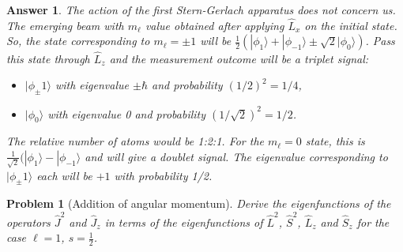 \documentclass[a4paper]{article}
\newtheorem{ans}{Answer}[section]
\theoremstyle{new}
\newtheorem{qns}{Problem}[section]
\begin{document}
\begin{ans}
The action of the first Stern-Gerlach apparatus does not concern us. The emerging beam with $m_\ell$ value obtained after applying $\hat{L}_x$ on the initial state. So, the state corresponding to $m_\ell=\pm1$ will be $\frac{1}{2}(|\phi_1\rangle+|\phi_{-1}\rangle\pm\sqrt{2}|\phi_0\rangle)$. Pass this state through $\hat{L}_z$ and the measurement outcome will be a triplet signal:
\begin{itemize}
    \item $|\phi_\pm1\rangle$ with eigenvalue $\pm\hbar$ and probability $(1/2)^2=1/4$,
    \item $|\phi_0\rangle$ with eigenvalue 0 and probability $(1/\sqrt{2})^2=1/2$.
\end{itemize}
The relative number of atoms would be 1:2:1. For the $m_\ell=0$ state, this is $\frac{1}{\sqrt{2}}(|\phi_1\rangle-|\phi_{-1}\rangle$ and will give a doublet signal. The eigenvalue corresponding to $|\phi_\pm1\rangle$ each will be $+1$ with probability 1/2.
\end{ans}
\newpage
\begin{qns}[Addition of angular momentum]
Derive the eigenfunctions of the operators $\hat{J}^2$ and $\hat{J}_z$ in terms of the eigenfunctions of $\hat{L}^2$, $\hat{S}^2$, $\hat{L}_z$ and $\hat{S}_z$  for the case $\ell= 1$, $s = \frac{1}{2}$.
\end{qns}
\end{document}
